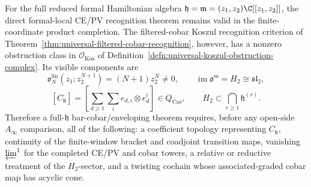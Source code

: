 \begin{cor}
\label{cor:full-maximal-ideal-universal-obstruction-class}
  For the full reduced formal Hamiltonian algebra
  \(\mathfrak h=\mathfrak m=(z_1,z_2)\C[[z_1,z_2]]\), the direct
  formal-local CE/PV recognition theorem remains valid in the
  finite-coordinate product completion.  The filtered-cobar
  Koszul recognition criterion of
  Theorem~\ref{thm:universal-filtered-cobar-recognition}, however, has
  a nonzero obstruction class in
  \(\mathcal O_{\mathrm{Kos}}\) of
  Definition~\ref{defn:universal-koszul-obstruction-complex}.  Its
  visible components are
  \[
    \mathfrak o^{\mathrm{lin}}_N(z_1;z_2^{N+1})
      =(N+1)z_2^N\neq0,
    \qquad
    \operatorname{im}\mathfrak o^{\mathrm{ss}}=H_2\cong\mathfrak{sl}_2,
  \]
  \[
    [C_{\mathfrak h}]
      =
      \left[
        \sum_{d\geq1}\sum_i e_{d,i}\otimes e_d^i
      \right]
      \in Q_{\mathrm{Cas}},
    \qquad
    H_2\subset\bigcap_{r\geq1}\mathfrak h^{(r)} .
  \]
  Therefore a full-\(\mathfrak h\)
  bar-cobar/enveloping theorem requires,
  before any open-side \(A_\infty\) comparison, all of the following:
  a coefficient topology representing \(C_{\mathfrak h}\), continuity of
  the finite-window bracket and coadjoint transition maps, vanishing
  \(\varprojlim^1\) for the completed CE/PV and cobar towers, a
  relative or reductive treatment of the
  \(H_2\)-sector, and a twisting cochain whose associated-graded cobar
  map has acyclic cone.
\end{cor}

